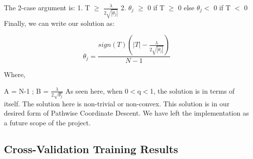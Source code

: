 \documentclass[11pt]{article}
\begin{document}
The 2-case argument is:
1. T $\geq$ $ \frac{\lambda }{2 \sqrt{|\theta_j|}}$
2. $\theta_j$ $\geq$ 0 if T $\geq$ 0 else $\theta_j $$< $ 0 if T $<$ 0
Finally, we can write our solution as:

\begin{equation}
\theta_j = \frac{sign(T)(|T|- \frac{\lambda}{2\sqrt{|\theta_j|}})}{N-1}
\end{equation}

Where, 

A = N-1 ; B = $\frac{\lambda}{2\sqrt{\theta_j}}$
As seen here, when 0$<$q$<$1, the solution is in terms of itself. The solution here is non-trivial or non-convex. This solution is in our desired form of Pathwise Coordinate Descent. We have left the implementation as a future scope of the project.


\subsection{Cross-Validation Training Results}
\label{cvtr}
\end{document}
